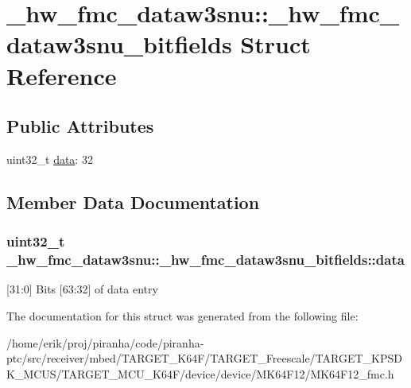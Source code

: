 \hypertarget{struct__hw__fmc__dataw3snu_1_1__hw__fmc__dataw3snu__bitfields}{}\section{\+\_\+hw\+\_\+fmc\+\_\+dataw3snu\+:\+:\+\_\+hw\+\_\+fmc\+\_\+dataw3snu\+\_\+bitfields Struct Reference}
\label{struct__hw__fmc__dataw3snu_1_1__hw__fmc__dataw3snu__bitfields}
\subsection*{Public Attributes}
\begin{DoxyCompactItemize}
\item 
uint32\+\_\+t \hyperlink{struct__hw__fmc__dataw3snu_1_1__hw__fmc__dataw3snu__bitfields_a50d158dbe7ff719226b6bd88c2608733}{data}\+: 32
\end{DoxyCompactItemize}


\subsection{Member Data Documentation}
\subsubsection[{\texorpdfstring{data}{data}}]{\setlength{\rightskip}{0pt plus 5cm}uint32\+\_\+t \+\_\+hw\+\_\+fmc\+\_\+dataw3snu\+::\+\_\+hw\+\_\+fmc\+\_\+dataw3snu\+\_\+bitfields\+::data}\hypertarget{struct__hw__fmc__dataw3snu_1_1__hw__fmc__dataw3snu__bitfields_a50d158dbe7ff719226b6bd88c2608733}{}\label{struct__hw__fmc__dataw3snu_1_1__hw__fmc__dataw3snu__bitfields_a50d158dbe7ff719226b6bd88c2608733}
\mbox{[}31\+:0\mbox{]} Bits \mbox{[}63\+:32\mbox{]} of data entry 

The documentation for this struct was generated from the following file\+:\begin{DoxyCompactItemize}
\item 
/home/erik/proj/piranha/code/piranha-\/ptc/src/receiver/mbed/\+T\+A\+R\+G\+E\+T\+\_\+\+K64\+F/\+T\+A\+R\+G\+E\+T\+\_\+\+Freescale/\+T\+A\+R\+G\+E\+T\+\_\+\+K\+P\+S\+D\+K\+\_\+\+M\+C\+U\+S/\+T\+A\+R\+G\+E\+T\+\_\+\+M\+C\+U\+\_\+\+K64\+F/device/device/\+M\+K64\+F12/M\+K64\+F12\+\_\+fmc.\+h\end{DoxyCompactItemize}
